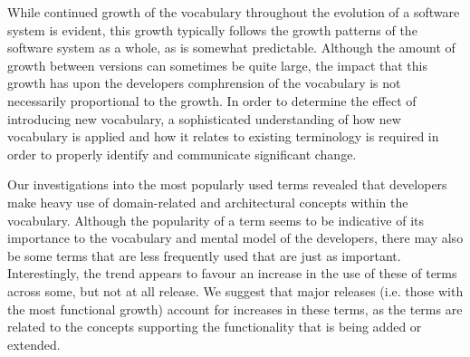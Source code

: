 While continued growth of the vocabulary throughout the evolution of a software system is evident, this growth typically follows the growth patterns of the software system as a whole, as is somewhat predictable. Although the amount of growth between versions can sometimes be quite large, the impact that this growth has upon the developers comphrension of the vocabulary is not necessarily proportional to the growth. In order to determine the effect of introducing new vocabulary, a sophisticated understanding of how new vocabulary is applied and how it relates to existing terminology is required in order to properly identify and communicate significant change.

Our investigations into the most popularly used terms revealed that developers make heavy use of domain-related and architectural concepts within the vocabulary. Although the popularity of a term seems to be indicative of its importance to the vocabulary and mental model of the developers, there may also be some terms that are less frequently used that are just as important. Interestingly, the trend appears to favour an increase in the use of these of terms across some, but not at all release. We suggest that major releases (i.e. those with the most functional growth) account for increases in these terms, as the terms are related to the concepts supporting the functionality that is being added or extended.


